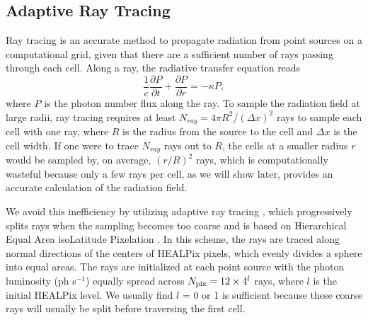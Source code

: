 \documentclass[useAMS,usenatbib,a4paper]{mn2e}
\begin{document}


\subsection{Adaptive Ray Tracing}
\label{sec:ART}

Ray tracing is an accurate method to propagate radiation from point
sources on a computational grid, given that there are a sufficient
number of rays passing through each cell.  Along a ray, the radiative
transfer equation reads
%
\begin{equation}
\label{eqn:rtray}
\frac{1}{c} \frac{\partial P}{\partial t} + \frac{\partial P}{\partial
  r} = -\kappa P,
\end{equation}
%
where $P$ is the photon number flux along the ray.  To sample the
radiation field at large radii, ray tracing requires at least $N_{ray}
= 4\pi R^2 / (\Delta x)^2$ rays to sample each cell with one ray,
where $R$ is the radius from the source to the cell and $\Delta x$ is
the cell width.  If one were to trace $N_{ray}$ rays out to $R$, the
cells at a smaller radius $r$ would be sampled by, on average,
$(r/R)^2$ rays, which is computationally wasteful because only a few
rays per cell, as we will show later, provides an accurate calculation
of the radiation field.

We avoid this inefficiency by utilizing adaptive ray tracing
\citep{Abel02_RT}, which progressively splits rays when the sampling
becomes too coarse and is based on Hierarchical Equal Area isoLatitude
Pixelation \citep[HEALPix;][]{HEALPix}.  In this scheme, the rays are
traced along normal directions of the centers of HEALPix pixels, which
evenly divides a sphere into equal areas.  The rays are initialized at
each point source with the photon luminosity (ph s$^{-1}$) equally
spread across $N_{\rm pix} = 12 \times 4^l$ rays, where $l$ is the
initial HEALPix level.  We usually find $l$ = 0 or 1 is sufficient
because these coarse rays will usually be split before traversing
the first cell.
\end{document}

